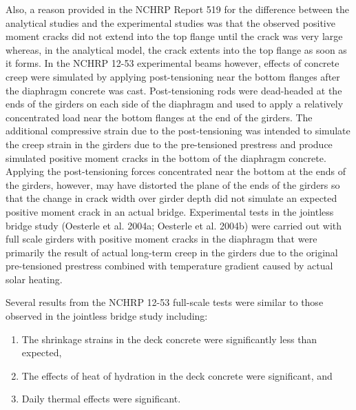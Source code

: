 Also, a reason provided in the NCHRP Report 519 for the difference between the analytical studies and the experimental studies was that the observed positive moment cracks did not extend into the top flange until the crack was very large whereas, in the analytical model, the crack extents into the top flange as soon as it forms. In the NCHRP 12-53 experimental beams however, effects of concrete creep were simulated by applying post-tensioning near the bottom flanges after the diaphragm concrete was cast. Post-tensioning rods were dead-headed at the ends of the girders on each side of the diaphragm and used to apply a relatively concentrated load near the bottom flanges at the end of the girders. The additional compressive strain due to the post-tensioning was intended to simulate the creep strain in the girders due to the pre-tensioned prestress and produce simulated positive moment cracks in the bottom of the diaphragm concrete. Applying the post-tensioning forces concentrated near the bottom at the ends of the girders, however, may have distorted the plane of the ends of the girders so that the change in crack width over girder depth did not simulate an expected positive moment crack in an actual bridge. Experimental tests in the jointless bridge study (Oesterle et al. 2004a; Oesterle et al. 2004b) were carried out with full scale girders with positive moment cracks in the diaphragm that were primarily the result of actual long-term creep in the girders due to the original pre-tensioned prestress combined with temperature gradient caused by actual solar heating.

Several results from the NCHRP 12-53 full-scale tests were similar to those observed in the jointless bridge study including:
\begin{enumerate}
  \item The shrinkage strains in the deck concrete were significantly less than expected,
  \item The effects of heat of hydration in the deck concrete were significant, and
  \item Daily thermal effects were significant.
\end{enumerate}

